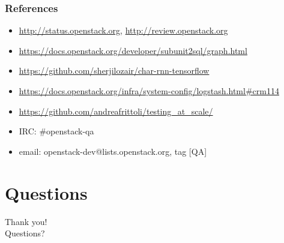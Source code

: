 \documentclass[aspectratio=169,11pt,hyperref={colorlinks=true}]{beamer}
\begin{document}
\begin{frame}
    \frametitle{References}
    \begin{itemize}
        \item{\href{http://status.openstack.org}{http://status.openstack.org}, 
                  \href{http://review.openstack.org}{http://review.openstack.org}}
        \item{\href{https://docs.openstack.org/developer/subunit2sql/graph.html}{https://docs.openstack.org/developer/subunit2sql/graph.html}}
        \item{\href{https://github.com/sherjilozair/char-rnn-tensorflow}{https://github.com/sherjilozair/char-rnn-tensorflow}}
        \item{\href{https://docs.openstack.org/infra/system-config/logstash.html\#crm114}{https://docs.openstack.org/infra/system-config/logstash.html\#crm114}}
        \item{\href{https://github.com/andreafrittoli/testing\_at\_scale/}{https://github.com/andreafrittoli/testing\_at\_scale/}}
    \end{itemize}
    \begin{itemize}
        \item{IRC: \#openstack-qa}
        \item{email: openstack-dev@lists.openstack.org, tag [QA]}
    \end{itemize}
\end{frame}


\section{Questions}
\begin{frame}[c]
    \begin{center}
        \Huge Thank you!\\Questions?
    \end{center}
\end{frame}
\end{document}
